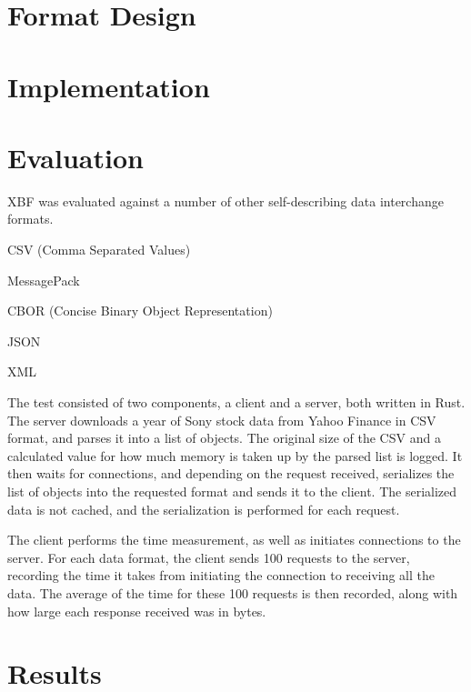 \documentclass[conference]{IEEEtran}
\begin{document}
\section{Format Design}

\section{Implementation}

\section{Evaluation}

XBF was evaluated against a number of other self-describing data interchange formats.

\begin{IEEEitemize}
	\item CSV (Comma Separated Values)\cite{csv_spec}\cite{csv_parser}
	\item MessagePack\cite{msgpack_spec}\cite{msgpack_parser}
	\item CBOR (Concise Binary Object Representation)\cite{cbor_spec}\cite{cbor_parser}
	\item JSON\cite{json_parser}
	\item XML\cite{xml_parser}
\end{IEEEitemize}

The test consisted of two components, a client and a server, both written in Rust. The server downloads a year of Sony stock data from Yahoo Finance\cite{sony_stock_data} in CSV format, and parses it into a list of objects. The original size of the CSV and a calculated value for how much memory is taken up by the parsed list is logged. It then waits for connections, and depending on the request received, serializes the list of objects into the requested format and sends it to the client. The serialized data is not cached, and the serialization is performed for each request.

The client performs the time measurement, as well as initiates connections to the server. For each data format, the client sends 100 requests to the server, recording the time it takes from initiating the connection to receiving all the data. The average of the time for these 100 requests is then recorded, along with how large each response received was in bytes.

\section{Results}
\end{document}
